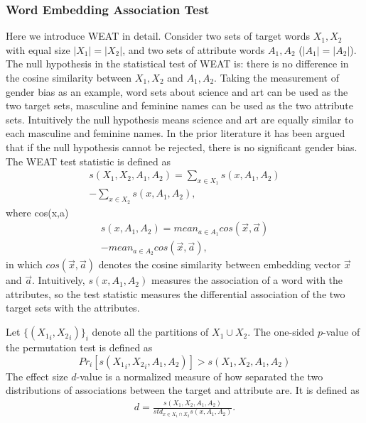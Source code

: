 \subsubsection{Word Embedding Association Test}
\label{sec:weat}
Here we introduce WEAT in detail. Consider two sets of target words $X_1,X_2$ with equal size $|X_1|=|X_2|$, and two sets of attribute words $A_1,A_2$ ($|A_1|=|A_2|$). The null hypothesis in the statistical test of WEAT is: there is no difference in the cosine similarity between $X_1,X_2$ and $A_1,A_2$. Taking the measurement of gender bias as an example, word sets about science and art can be used as the two target sets, masculine and feminine names can be used as the two attribute sets. Intuitively the null hypothesis means science and art are equally similar to each masculine and feminine names. In the prior literature it has been argued that if the null hypothesis cannot be rejected, there is no significant gender bias.  The WEAT test statistic is defined as
\begin{eqnarray}
s(X_1,X_2,A_1,A_2)=\sum_{x\in X_1}s(x,A_1,A_2)\nonumber\\
-\sum_{x\in X_2}s(x,A_1,A_2),\nonumber
\end{eqnarray}
where cos(x,a)
\begin{eqnarray}
s(x,A_1,A_2)=mean_{a\in A_1}cos(\vec{x},\vec{a})\nonumber\\
-mean_{a\in A_2}cos(\vec{x},\vec{a}),\nonumber
\end{eqnarray}
in which $cos(\vec{x},\vec{a})$ denotes the cosine similarity between embedding vector $\vec{x}$ and $\vec{a}$. Intuitively, $s(x,A_1,A_2)$ measures the association of a word with the attributes, so the test statistic measures the differential association of the two target sets with the attributes. 

Let $\{({X_1}_i,{X_2}_i)\}_{i}$ denote all the partitions of $X_1\cup X_2$. The one-sided $p$-value of the permutation test is defined as $$Pr_i[s({X_1}_i,{X_2}_i,A_1,A_2)]>s(X_1,X_2,A_1,A_2)$$
The effect size $d$-value is a normalized measure of how separated the two distributions of associations between the target and attribute are. It is defined as
\begin{eqnarray}
d=\frac{s(X_1,X_2,A_1,A_2)}{std_{x\in X_1 \cap X_2}s(x,A_1,A_2)}.\nonumber
\end{eqnarray}

